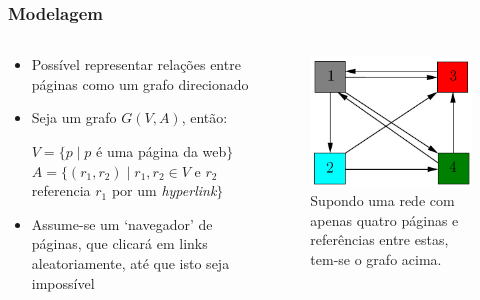 \documentclass{beamer}
\begin{document}
\begin{frame}
    \frametitle{Modelagem}
    \begin{columns}[T]
        \begin{column}{.55\textwidth}
            \begin{itemize}
                \item Possível representar relações entre páginas como um
                grafo direcionado
                \item Seja um grafo $G(V, A)$, então:
                \begin{center}
                    $V = \{p \mid p$ é uma página da web$\}$ \\
                    $A = \{(r_1, r_2) \mid r_1, r_2 \in V$ e $r_2$
                    referencia $r_1$ por um \textit{hyperlink}$\}$
                \end{center}
                \item Assume-se um `navegador' de páginas, que clicará em
                links aleatoriamente, até que isto seja impossível
            \end{itemize}
        \end{column}
        \begin{column}{.4\textwidth}
        \begin{figure}
            \includegraphics[scale=0.45]{pr_1}
            \caption{\tiny{Supondo uma rede com apenas quatro páginas e
            referências entre estas, tem-se o grafo acima.}}
        \end{figure}
        \end{column}
    \end{columns}
\end{frame}
\end{document}
